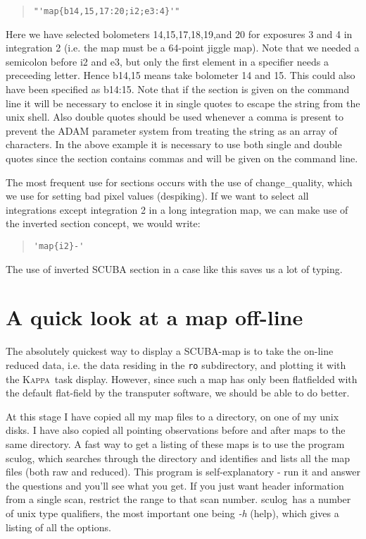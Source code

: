 \documentclass[twoside,11pt]{article}
\newenvironment{myquote}{\begin{quote}\begin{small}}{\end{small}\end{quote}}
\newcommand{\Kappa}{\xref{\textsc{Kappa}}{sun95}{}}
\newcommand{\task}[1]{\textsf{#1}}
\newcommand{\chgqual}{\xref{\task{change\_\-qua\-lity}}{sun216}{CHANGE_QUALITY}}
\newcommand{\sculog}{\xref{\task{sculog}}{sun216}{SCULOG}}
\newcommand{\display}{\xref{\task{display}}{sun95}{DISPLAY}}
\newcommand{\xref}[3]{#1}
\newcommand{\xlabel}[1]{}
\begin{document}
\begin{myquote}
\begin{verbatim}
"'map{b14,15,17:20;i2;e3:4}'"   
\end{verbatim}
\end{myquote}

Here we have selected bolometers 14,15,17,18,19,and 20 for exposures 3 and
4 in integration 2 (i.e. the map must be a 64-point jiggle map). Note that
we needed a semicolon before i2 and e3, but only the first element in a
specifier needs a preceeding letter. Hence b14,15 means take bolometer
14 and 15. This could also have been specified as b14:15. Note that if the
section is given on the command line it will be necessary to enclose it in
single quotes to escape the string from the unix shell. Also double quotes
should be used whenever a comma is present to prevent the ADAM parameter
system from treating the string as an array of characters. In the above
example it is necessary to use both single and double quotes since the 
section contains commas and will be given on the command line.


The most frequent use for sections occurs with the use of \chgqual, which we
use for setting bad pixel values (despiking). If we want to select all
integrations except integration 2 in a long integration map, we can make use
of the inverted section concept, we would write:

\begin{myquote}
\begin{verbatim}
'map{i2}-'
\end{verbatim}
\end{myquote}

The use of inverted SCUBA section in a case like this saves us a lot of
typing.

       
\section{\xlabel{a_quick_look_at_a_map_off-line}A quick look at a map off-line}

The absolutely quickest way to display a SCUBA-map is to take the on-line
reduced data, i.e. the data residing in the \texttt{ro} subdirectory, and
plotting it with the \Kappa\ task \display. However, since such a map has only
been flatfielded with the default flat-field by the transputer software, we
should be able to do better.

At this stage I have copied all my map files to a directory, on one of my
unix disks. I have also copied all pointing observations before and after
maps to the same directory.  A fast way to get a listing of these maps
is to use the program \sculog, which searches through the directory
and identifies and lists all the map files (both raw and reduced). This
program is self-explanatory - run it and answer the questions and
you'll see what you get. If you just want header information from a
single scan, restrict the range to that scan number. \sculog\ has
a number of unix type qualifiers, the most important one being {\it -h}
(help), which gives a listing of all the options.
\end{document}
